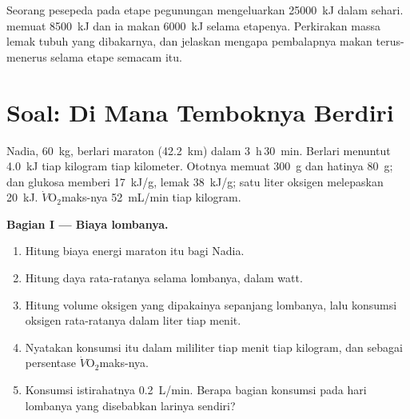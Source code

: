 \begin{exercise}[$\star\star\star$]\label{exo:g10:exercise-and-energy:15}
Seorang pesepeda pada etape pegunungan mengeluarkan \qty{25000}{kJ}
dalam sehari.  memuat \qty{8500}{kJ} dan ia makan
\qty{6000}{kJ} selama etapenya. Perkirakan massa lemak tubuh yang
dibakarnya, dan jelaskan mengapa pembalapnya makan terus-menerus selama
etape semacam itu.
\end{exercise}

\section{Soal: Di Mana Temboknya Berdiri}

\begin{problem}
\label{pb:g10:exercise-and-energy:1}
Nadia, \qty{60}{kg}, berlari maraton (\qty{42.2}{km}) dalam
\qty{3}{h}\,\qty{30}{min}. Berlari menuntut \qty{4.0}{kJ} tiap kilogram
tiap kilometer. Ototnya memuat \qty{300}{g}  dan hatinya
\qty{80}{g};  dan glukosa memberi \qty{17}{kJ/g}, lemak
\qty{38}{kJ/g}; satu liter oksigen melepaskan \qty{20}{kJ}.
$\dot V\!\mathrm{O_2}$maks-nya \qty{52}{mL/min} tiap kilogram.

\medskip
\noindent\textbf{Bagian I --- Biaya lombanya.}
\begin{enumerate}
  \item Hitung biaya energi maraton itu bagi Nadia.
  \item Hitung daya  rata-ratanya selama lombanya, dalam
        watt.
  \item Hitung volume oksigen yang dipakainya sepanjang lombanya, lalu
        konsumsi oksigen rata-ratanya dalam liter tiap menit.
  \item Nyatakan konsumsi itu dalam mililiter tiap menit tiap kilogram,
        dan sebagai persentase $\dot V\!\mathrm{O_2}$maks-nya.
  \item Konsumsi istirahatnya \qty{0.2}{L/min}. Berapa bagian konsumsi
        pada hari lombanya yang disebabkan larinya sendiri?
\end{enumerate}


\end{problem}
